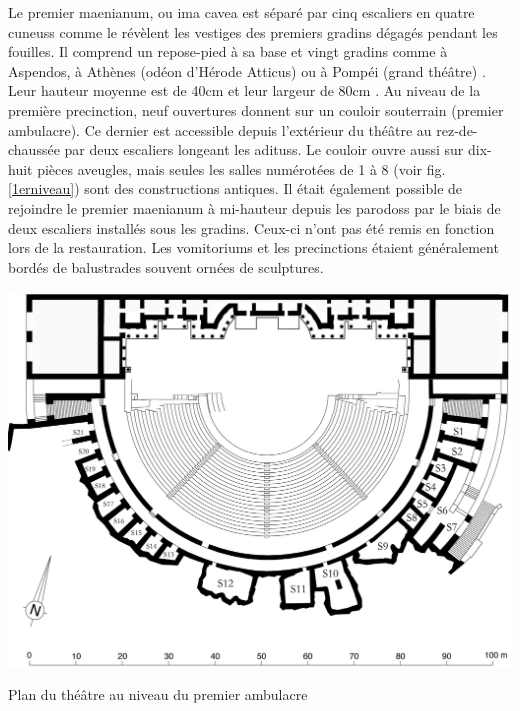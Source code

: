 		Le premier \gls{maenianum}, ou \gls{ima cavea} est séparé par cinq escaliers en quatre \glspl{cuneus} comme le révèlent les vestiges des premiers gradins dégagés pendant les fouilles. Il comprend un repose-pied à sa base et vingt gradins comme à Aspendos, à Athènes (odéon d'Hérode Atticus) ou à Pompéi (grand théâtre) \citep[p. 34]{formige}. Leur hauteur moyenne est de 40cm et leur largeur de 80cm \cite[p. 31]{formige}. Au niveau de la première \gls{precinction}, neuf ouvertures donnent  sur un couloir souterrain (premier \gls{ambulacre}). Ce dernier est accessible depuis l'extérieur du théâtre au rez-de-chaussée par deux escaliers longeant les \glspl{aditus}. Le couloir ouvre aussi sur dix-huit pièces aveugles, mais seules les salles numérotées de 1 à 8 (voir fig. \ref{1erniveau}) sont des constructions antiques. Il était également possible de rejoindre le premier \gls{maenianum} à mi-hauteur depuis les \glspl{parodos} par le biais de deux escaliers installés sous les gradins. Ceux-ci n'ont pas été remis en fonction lors de la restauration. Les \glspl{vomitorium} et les \glspl{precinction} étaient généralement bordés de balustrades souvent ornées de sculptures.
		
	\begin{figureth}
		\includegraphics[width=\linewidth]{images/1erniveau}
		\caption[Vue de dessus - 1er niveau]{Plan du théâtre au niveau du premier \gls{ambulacre} \footnotemark }
		\label{1erniveau}
	\end{figureth}		
	
